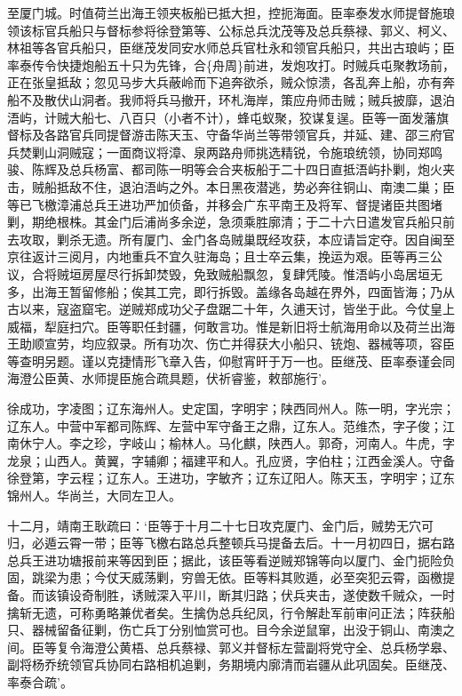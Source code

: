 \documentclass[]{article}
\begin{document}
至厦门城。时值荷兰出海王领夹板船已抵大担，控扼海面。臣率泰发水师提督施琅领该标官兵船只与督标参将徐登第等、公标总兵沈茂等及总兵蔡禄、郭义、柯义、林祖等各官兵船只，臣继茂发同安水师总兵官杜永和领官兵船只，共出古琅屿；臣率泰传令快捷炮船五十只为先锋，合\{舟周\}前进，发炮攻打。时贼兵屯聚教场前，正在张皇抵敌；忽见马步大兵蔽岭而下追奔欲杀，贼众惊溃，各乱奔上船，亦有奔船不及散伏山洞者。我师将兵马撤开，环札海岸，策应舟师击贼；贼兵披靡，退泊浯屿，计贼大船七、八百只（小者不计），蜂屯蚁聚，狡谋复逞。臣等一面发藩旗督标及各路官兵同提督游击陈天玉、守备华尚兰等带领官兵，并延、建、邵三府官兵焚剿山洞贼寇；一面商议将漳、泉两路舟师挑选精锐，令施琅统领，协同郑鸣骏、陈辉及总兵杨富、都司陈一明等会合夹板船于二十四日直抵浯屿扑剿，炮火夹击，贼船抵敌不住，退泊浯屿之外。本日黑夜潜逃，势必奔往铜山、南澳二巢；臣等已飞檄漳浦总兵王进功严加侦备，并移会广东平南王及将军、督提诸臣共图堵剿，期绝根株。其金门后浦尚多余逆，急须乘胜廓清；于二十六日遣发官兵船只前去攻取，剿杀无遗。所有厦门、金门各岛贼巢既经攻获，本应请旨定夺。因自闽至京往返计三阅月，内地重兵不宜久驻海岛；且士卒云集，挽运为艰。臣等再三公议，合将贼垣房屋尽行拆卸焚毁，免致贼船飘忽，复肆凭陵。惟浯屿小岛居垣无多，出海王暂留修船；俟其工完，即行拆毁。盖缘各岛越在界外，四面皆海；乃从古以来，寇盗窟宅。逆贼郑成功父子盘踞二十年，久逋天讨，皆坐于此。今仗皇上威福，犁庭扫穴。臣等职任封疆，何敢言功。惟是新旧将士航海用命以及荷兰出海王助顺宣劳，均应叙录。所有功次、伤亡并得获大小船只、铳炮、器械等项，容臣等查明另题。谨以克捷情形飞章入告，仰慰宵旰于万一也。臣继茂、臣率泰谨会同海澄公臣黄、水师提臣施合疏具题，伏祈睿鉴，敕部施行'。

徐成功，字凌图；辽东海州人。史定国，字明宇；陕西同州人。陈一明，字光宗；辽东人。中营中军都司陈辉、左营中军守备王之鼎，辽东人。范维杰，字子俊；江南休宁人。李之珍，字岐山；榆林人。马化麒，陕西人。郭奇，河南人。牛虎，字龙泉；山西人。黄翼，字辅卿；福建平和人。孔应贤，字伯柱；江西金溪人。守备徐登第，字云程；辽东人。王进功，字敏齐；辽东辽阳人。陈天玉，字明宇；辽东锦州人。华尚兰，大同左卫人。

十二月，靖南王耿疏曰：`臣等于十月二十七日攻克厦门、金门后，贼势无穴可归，必遁云霄一带；臣等飞檄右路总兵整顿兵马提备去后。十一月初四日，据右路总兵王进功塘报前来等因到臣；据此，该臣等看逆贼郑锦等向以厦门、金门扼险负固，跳梁为患；今仗天威荡剿，穷兽无依。臣等料其败遁，必至突犯云霄，函檄提备。而该镇设奇制胜，诱贼深入平川，断其归路；伏兵夹击，遂使数千贼众，一时擒斩无遗，可称勇略兼优者矣。生擒伪总兵纪凤，行令解赴军前审问正法；阵获船只、器械留备征剿，伤亡兵丁分别恤赏可也。目今余逆鼠窜，出没于铜山、南澳之间。臣等复令海澄公黄梧、总兵蔡禄、郭义并督标左营副将党守全、总兵杨学皋、副将杨乔统领官兵协同右路相机追剿，务期境内廓清而岩疆从此巩固矣。臣继茂、率泰合疏'。
\end{document}
